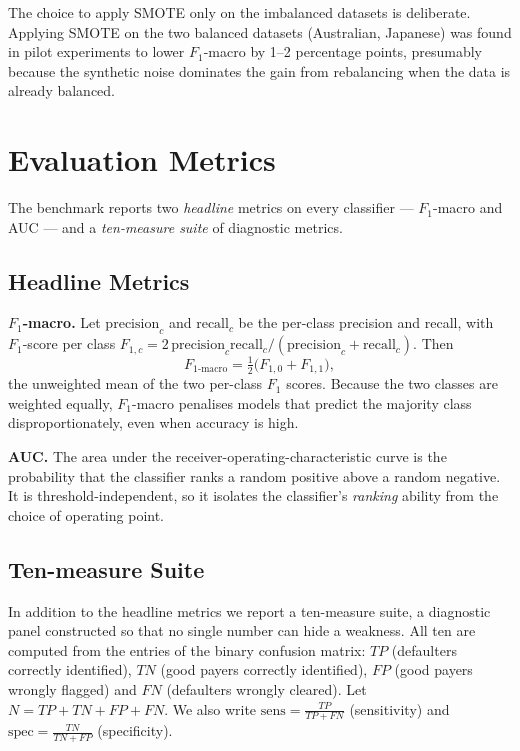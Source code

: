 The choice to apply SMOTE only on the imbalanced datasets is
deliberate. Applying SMOTE on the two balanced datasets
(Australian, Japanese) was found in pilot experiments to lower
$F_1$-macro by 1--2 percentage points, presumably because the
synthetic noise dominates the gain from rebalancing when the data
is already balanced.

\section{Evaluation Metrics}
\label{sec:metrics}

The benchmark reports two \emph{headline} metrics on every
classifier --- $F_1$-macro and AUC --- and a \emph{ten-measure
suite} of diagnostic metrics.

\subsection{Headline Metrics}

\textbf{$F_1$-macro.} Let
$\mathrm{precision}_c$ and $\mathrm{recall}_c$ be the per-class
precision and recall, with $F_1$-score per class
$F_{1,c}=2\,\mathrm{precision}_c \mathrm{recall}_c
/(\mathrm{precision}_c+\mathrm{recall}_c)$. Then
\begin{equation}
F_{1\text{-macro}}
=
\tfrac{1}{2}\bigl(F_{1,0} + F_{1,1}\bigr),
\tag{4.1}
\label{eq:f1macro}
\end{equation}
the unweighted mean of the two per-class $F_1$ scores. Because the
two classes are weighted equally, $F_1$-macro penalises models that
predict the majority class disproportionately, even when accuracy
is high.

\textbf{AUC.} The area under the receiver-operating-characteristic
curve is the probability that the classifier ranks a random positive
above a random negative. It is threshold-independent, so it
isolates the classifier's \emph{ranking} ability from the choice of
operating point.

\subsection{Ten-measure Suite}
\label{sec:ten-measure}

In addition to the headline metrics we report a ten-measure suite,
a diagnostic panel constructed so that no single number can hide a
weakness.  All ten are computed from the entries of the binary
confusion matrix: $TP$ (defaulters correctly identified), $TN$ (good
payers correctly identified), $FP$ (good payers wrongly flagged) and
$FN$ (defaulters wrongly cleared).  Let $N=TP+TN+FP+FN$.  We also
write $\text{sens}=\frac{TP}{TP+FN}$ (sensitivity) and
$\text{spec}=\frac{TN}{TN+FP}$ (specificity).

